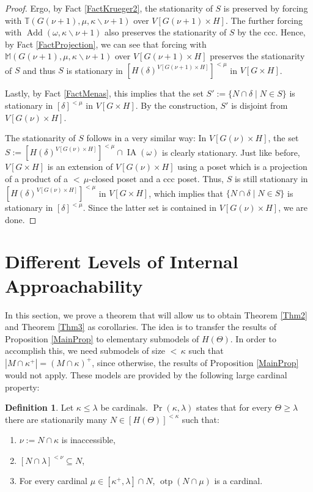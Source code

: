 \documentclass[a4paper]{amsart}
\theoremstyle{definition}
\newtheorem{mydef}{Definition}[section]
\theoremstyle{remark}
\theoremstyle{plain}
\numberwithin{mydef}{section}
\DeclareMathOperator{\otp}{otp}
\DeclareMathOperator{\Add}{Add}
\DeclareMathOperator{\IA}{IA}
\newcommand{\dM}{\mathbb{M}}
\newcommand{\dT}{\mathbb{T}}
\begin{document}
\begin{proof}
		Ergo, by Fact \ref{FactKrueger2}, the stationarity of $S$ is preserved by forcing with $\dT(G(\nu+1),\mu,\kappa\smallsetminus\nu+1)$ over $V[G(\nu+1)\times H]$. The further forcing with $\Add(\omega,\kappa\smallsetminus\nu+1)$ also preserves the stationarity of $S$ by the ccc. Hence, by Fact \ref{FactProjection}, we can see that forcing with $\dM(G(\nu+1),\mu,\kappa\smallsetminus\nu+1)$ over $V[G(\nu+1)\times H]$ preserves the stationarity of $S$ and thus $S$ is stationary in $[H(\delta)^{V[G(\nu+1)\times H]}]^{<\mu}$ in $V[G\times H]$.
		
		Lastly, by Fact \ref{FactMenas}, this implies that the set $S':=\{N\cap\delta\;|\;N\in S\}$ is stationary in $[\delta]^{<\mu}$ in $V[G\times H]$. By the construction, $S'$ is disjoint from $V[G(\nu)\times H]$.
		
		The stationarity of $S$ follows in a very similar way: In $V[G(\nu)\times H]$, the set $S:=[H(\delta)^{V[G(\nu)\times H]}]^{<\mu}\cap\IA(\omega)$ is clearly stationary. Just like before, $V[G\times H]$ is an extension of $V[G(\nu)\times H]$ using a poset which is a projection of a product of a ${<}\,\mu$-closed poset and a ccc poset. Thus, $S$ is still stationary in $[H(\delta)^{V[G(\nu)\times H]}]^{<\mu}$ in $V[G\times H]$, which implies that $\{N\cap\delta\;|\;N\in S\}$ is stationary in $[\delta]^{<\mu}$. Since the latter set is contained in $V[G(\nu)\times H]$, we are done.
	\end{proof}
	
	\section{Different Levels of Internal Approachability}
	
	In this section, we prove a theorem that will allow us to obtain Theorem \ref{Thm2} and Theorem \ref{Thm3} as corollaries. The idea is to transfer the results of Proposition \ref{MainProp} to elementary submodels of $H(\Theta)$. In order to accomplish this, we need submodels of size ${<}\,\kappa$ such that $|M\cap\kappa^+|=(M\cap\kappa)^+$, since otherwise, the results of Proposition \ref{MainProp} would not apply. These models are provided by the following large cardinal property:
	
	\begin{mydef}
		Let $\kappa\leq\lambda$ be cardinals. $\Pr(\kappa,\lambda)$ states that for every $\Theta\geq\lambda$ there are stationarily many $N\in[H(\Theta)]^{<\kappa}$ such that:
		\begin{enumerate}
			\item $\nu:=N\cap\kappa$ is inaccessible,
			\item $[N\cap\lambda]^{<\nu}\subseteq N$,
			\item For every cardinal $\mu\in[\kappa^+,\lambda]\cap N$, $\otp(N\cap\mu)$ is a cardinal.
		\end{enumerate}
	\end{mydef}
	
\end{document}

